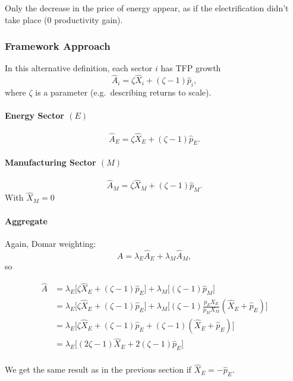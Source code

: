 \documentclass[11pt]{article}
\begin{document}
Only the decrease in the price of energy appear, as if the electrification didn't take place (0 productivity gain).


\subsubsection{Framework Approach}

In this alternative definition, each sector $i$ has TFP growth
\[
  \hat{A}_i
   = 
  \zeta \hat{X}_i
   + 
  (\zeta - 1) \hat{p}_i,
\]
where $\zeta$ is a parameter (e.g.\ describing returns to scale).

\paragraph{Energy Sector \((E)\)}

\[
  \hat{A}_E
   = 
  \zeta \hat{X}_E 
   + 
  (\zeta - 1) \hat{p}_E.
\]

\paragraph{Manufacturing Sector \((M)\)}

\[
  \hat{A}_M
   = 
  \zeta \hat{X}_M
   + 
  (\zeta - 1) \hat{p}_M.
\]
With $\hat{X}_M=0$ 

\paragraph{Aggregate}

Again, Domar weighting:
\[
  \hat{A}
   = 
  \lambda_E \hat{A}_E
   + 
  \lambda_M \hat{A}_M,
\]
so



\begin{align*}
    \hat{A}
   &= 
  \lambda_E\bigl[\zeta \hat{X}_E + (\zeta -1) \hat{p}_E\bigr]
   + 
  \lambda_M\bigl[(\zeta -1) \hat{p}_M\bigr]\\
   &= 
  \lambda_E\bigl[\zeta \hat{X}_E + (\zeta -1) \hat{p}_E\bigr]
   + 
  \lambda_M\bigl[(\zeta -1) \frac{p_EX_E}{p_MX_M}\left(\hat{X}_E+\hat{p}_E\right)\bigr]\\
     &= 
  \lambda_E\bigl[\zeta \hat{X}_E + (\zeta -1) \hat{p}_E
   + 
(\zeta -1) \left(\hat{X}_E+\hat{p}_E\right)\bigr]\\
     &= 
  \lambda_E\bigl[(2\zeta-1) \hat{X}_E + 2(\zeta -1) \hat{p}_E \bigr]\\
\end{align*}

We get the same result as in the previous section if $\hat{X}_E=-\hat{p}_E $.
\end{document}

